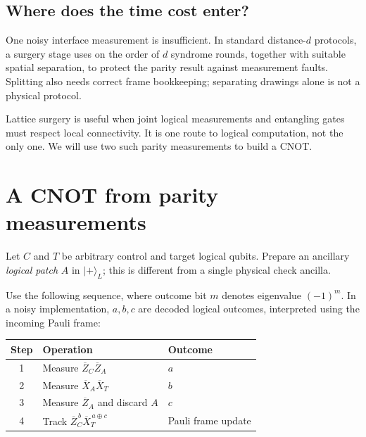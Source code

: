 \documentclass[11pt,a4paper]{article}
\newcommand{\ket}[1]{\lvert #1\rangle}
\newcommand{\XL}{\overline{X}}
\newcommand{\ZL}{\overline{Z}}
\begin{document}
\subsection*{Where does the time cost enter?}
One noisy interface measurement is insufficient. In standard distance-$d$ protocols, a surgery stage uses on the order of $d$ syndrome rounds, together with suitable spatial separation, to protect the parity result against measurement faults. Splitting also needs correct frame bookkeeping; separating drawings alone is not a physical protocol.

Lattice surgery is useful when joint logical measurements and entangling gates must respect local connectivity. It is one route to logical computation, not the only one. We will use two such parity measurements to build a CNOT.

\newpage
\section{A CNOT from parity measurements}

Let $C$ and $T$ be arbitrary control and target logical qubits. Prepare an ancillary \emph{logical patch} $A$ in $\ket{+}_L$; this is different from a single physical check ancilla.

Use the following sequence, where outcome bit $m$ denotes eigenvalue $(-1)^m$. In a noisy implementation, $a,b,c$ are decoded logical outcomes, interpreted using the incoming Pauli frame:
\begin{center}
\begin{tabular}{cll}
\toprule
Step & Operation & Outcome\\
\midrule
1 & Measure $\ZL_C\ZL_A$ & $a$\\
2 & Measure $\XL_A\XL_T$ & $b$\\
3 & Measure $\ZL_A$ and discard $A$ & $c$\\
4 & Track $\ZL_C^{\,b}\XL_T^{\,a\oplus c}$ & Pauli frame update\\
\bottomrule
\end{tabular}
\end{center}

\begin{center}
\cnotpatches
{}
\end{center}
\end{document}

